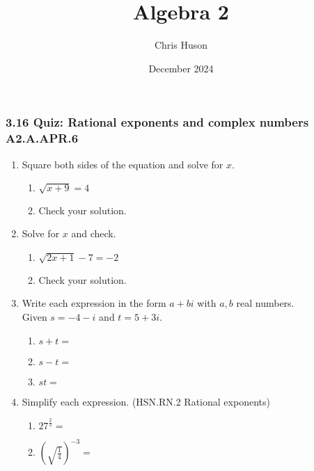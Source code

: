 \documentclass[12pt, twoside]{article}
\title{Algebra 2}
\author{Chris Huson}
\date{December 2024}
\begin{document}
\subsubsection*{3.16 Quiz: Rational exponents and complex numbers \hfill A2.A.APR.6}
\begin{enumerate}[itemsep=0.5cm]


\item Square both sides of the equation and solve for $x$.
    \begin{multicols}{2}
    \begin{enumerate}[itemsep=0.5cm]
        \item  $\sqrt{x+9}=4$
        \item Check your solution.
    \end{enumerate}
    \end{multicols} \vspace{3cm}

\item Solve for $x$ and check.
    \begin{multicols}{2}
    \begin{enumerate}[itemsep=0.5cm]
        \item  $\sqrt{2x+1} - 7 = -2$
        \item Check your solution.
    \end{enumerate}
    \end{multicols} \vspace{3cm}

\item Write each expression in the form $a+bi$ with $a,b$ real numbers. \\[0.25cm]
Given  $s = -4 - i $ and $t = 5 + 3i$.
    \begin{enumerate}[itemsep=1.5cm]
        \item $s+t =$
        \item $s-t =$
        \item $st =$
    \end{enumerate} \vspace{3cm}
    
\newpage
\item Simplify each expression. \hfill (HSN.RN.2 Rational exponents)
    \begin{multicols}{2}
    \begin{enumerate}[itemsep=0.5cm]
        \item $\displaystyle 27^{\frac{2}{3}} =$
        \item $\left( \sqrt{\frac{1}{4}} \right)^{-3} =$
    \end{enumerate}
    \end{multicols} \vspace{2cm}


\end{enumerate}
\end{document}
